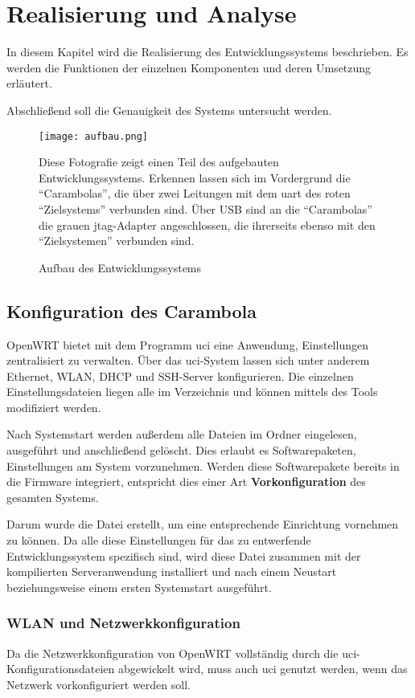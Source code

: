 \chapter{Realisierung und Analyse}\label{chap:realisierung}
\minitoc
In diesem Kapitel wird die Realisierung des Entwicklungssystems
beschrieben. Es werden die Funktionen der einzelnen Komponenten und deren
Umsetzung erläutert.

Abschließend soll die Genauigkeit des Systems untersucht werden. 
\begin{figure}[!ht]
\centering
\texttt{[image: aufbau.png]}
\caption{Aufbau des Entwicklungssystems}{Diese Fotografie zeigt einen
Teil des aufgebauten Entwicklungssystems. Erkennen lassen sich im
Vordergrund die "`Carambolas"', die über zwei Leitungen mit dem \gls{uart} des
roten "`Zielsystems"' verbunden sind. Über USB sind an die "`Carambolas"' die
grauen \gls{jtag}-Adapter angeschlossen, die ihrerseits ebenso mit den
"`Zielsystemen"' verbunden sind.}
\label{fig:aufbau}
\end{figure}
\section{Konfiguration des Carambola}\label{sec:conf}
OpenWRT bietet mit dem Programm \gls{uci} eine Anwendung, Einstellungen
zentralisiert zu verwalten. Über das \gls{uci}-System lassen sich unter anderem
Ethernet, WLAN, DHCP und SSH-Server konfigurieren. Die einzelnen
Einstellungsdateien liegen alle im Verzeichnis  und
können mittels des Tools modifiziert werden.

Nach Systemstart werden außerdem alle Dateien im Ordner
 eingelesen, ausgeführt und anschließend gelöscht.
Dies erlaubt es Softwarepaketen, Einstellungen am System vorzunehmen. Werden
diese Softwarepakete bereits in die Firmware integriert, entspricht dies einer
Art \textbf{Vorkonfiguration} des gesamten Systems. 

Darum wurde die Datei  erstellt, um eine
entsprechende Einrichtung vornehmen zu können. Da alle diese Einstellungen für
das zu entwerfende Entwicklungssystem spezifisch sind, wird diese Datei zusammen
mit der kompilierten Serveranwendung installiert und nach einem Neustart
beziehungsweise einem ersten Systemstart ausgeführt.
\subsection{WLAN und Netzwerkkonfiguration}
Da die Netzwerkkonfiguration von OpenWRT vollständig durch die
\gls{uci}-Konfigurationsdateien abgewickelt wird, muss auch \gls{uci} genutzt
werden, wenn das Netzwerk vorkonfiguriert werden soll.

